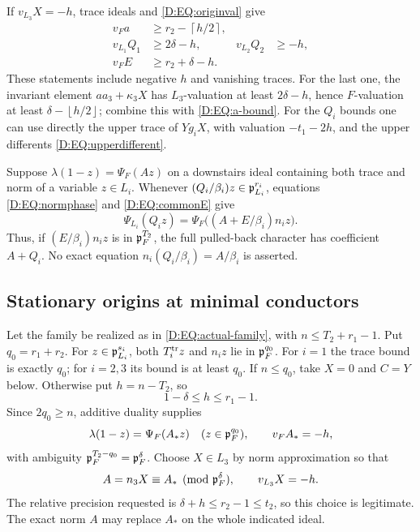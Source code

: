 \documentclass[11pt]{amsart}
\theoremstyle{definition}
\theoremstyle{remark}
\newcommand{\ceil}[1]{\left\lceil #1\right\rceil}
\newcommand{\floor}[1]{\left\lfloor #1\right\rfloor}
\begin{document}
If $v_{L_3}X=-h$, trace ideals and \eqref{D:EQ:originval} give
\begin{align}
 v_F a&\ge r_2-\ceil{h/2},                       \label{D:EQ:a-bound}\\
 v_{L_1}Q_1&\ge2\delta-h,&
 v_{L_2}Q_2&\ge-h,                              \label{D:EQ:Q-bound}\\
 v_F E&\ge r_2+\delta-h.                        \label{D:EQ:E-bound}
\end{align}
These statements include negative $h$ and vanishing traces.
For the last one, the invariant element $a a_3+\kappa_3X$ has
$L_3$-valuation at least $2\delta-h$, hence $F$-valuation at least
$\delta-\floor{h/2}$; combine this with \eqref{D:EQ:a-bound}.
For the $Q_i$ bounds one can use directly the upper trace of
$Yg_iX$, with valuation $-t_1-2h$, and the upper differents
\eqref{D:EQ:upperdifferent}.

Suppose $\lambda(1-z)=\Psi_F(Az)$ on a downstairs ideal containing
both trace and norm of a variable $z\in L_i$.
Whenever $(Q_i/\beta_i)z\in\mathfrak p_{L_i}^{r_i}$, equations
\eqref{D:EQ:normphase} and \eqref{D:EQ:commonE} give
\begin{equation}\label{D:EQ:pullback-adjust}
 \Psi_{L_i}(Q_iz)
 =\Psi_F\bigl((A+E/\beta_i)n_i z\bigr).
\end{equation}
Thus, if $(E/\beta_i)n_i z$ is in $\mathfrak p_F^{T_2}$, the full pulled-back
character has coefficient $A+Q_i$. No exact equation
$n_i(Q_i/\beta_i)=A/\beta_i$ is asserted.

\subsection{Stationary origins at minimal conductors}
Let the family be realized as in \eqref{D:EQ:actual-family}, with
$n\le T_2+r_1-1$. Put $q_0=r_1+r_2$.
For $z\in\mathfrak p_{L_i}^{s_i}$, both $T_i^{\rm tr}z$ and $n_i z$ lie in
$\mathfrak p_F^{q_0}$. For $i=1$ the trace bound is exactly $q_0$;
for $i=2,3$ its bound is at least $q_0$.
If $n\le q_0$, take $X=0$ and $C=Y$ below.
Otherwise put $h=n-T_2$, so
\begin{equation}\label{D:EQ:min-h}
 1-\delta\le h\le r_1-1.
\end{equation}
Since $2q_0\ge n$, additive duality supplies
\[
 \lambda(1-z)=\Psi_F(A_*z)\quad(z\in\mathfrak p_F^{q_0}),\qquad
 v_FA_*=-h,
\]
with ambiguity $\mathfrak p_F^{T_2-q_0}=\mathfrak p_F^\delta$.
Choose $X\in L_3$ by norm approximation so that
\begin{equation}\label{D:EQ:min-approx}
 A=n_3X\equiv A_*\pmod{\mathfrak p_F^\delta},\qquad v_{L_3}X=-h.
\end{equation}
The relative precision requested is $\delta+h\le r_2-1\le t_2$,
so this choice is legitimate. The exact norm $A$ may replace $A_*$
on the whole indicated ideal.
\end{document}
